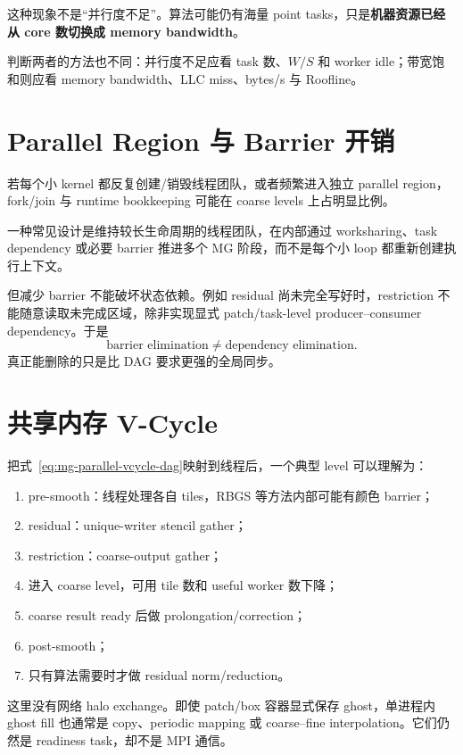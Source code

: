 这种现象不是“并行度不足”。算法可能仍有海量 point tasks，只是\textbf{机器资源已经从 core 数切换成 memory bandwidth}。

判断两者的方法也不同：并行度不足应看 task 数、$W/S$ 和 worker idle；带宽饱和则应看 memory bandwidth、LLC miss、bytes/s 与 Roofline。

\section{Parallel Region 与 Barrier 开销}

若每个小 kernel 都反复创建/销毁线程团队，或者频繁进入独立 parallel region，fork/join 与 runtime bookkeeping 可能在 coarse levels 上占明显比例。

一种常见设计是维持较长生命周期的线程团队，在内部通过 worksharing、task dependency 或必要 barrier 推进多个 MG 阶段，而不是每个小 loop 都重新创建执行上下文。

但减少 barrier 不能破坏状态依赖。例如 residual 尚未完全写好时，restriction 不能随意读取未完成区域，除非实现显式 patch/task-level producer--consumer dependency。于是
\begin{equation}
\boxed{
\text{barrier elimination}
\neq
\text{dependency elimination}.
}
\end{equation}
真正能删除的只是比 DAG 要求更强的全局同步。

\section{共享内存 V-Cycle}

把式~\eqref{eq:mg-parallel-vcycle-dag}映射到线程后，一个典型 level 可以理解为：

\begin{enumerate}
\item pre-smooth：线程处理各自 tiles，RBGS 等方法内部可能有颜色 barrier；
\item residual：unique-writer stencil gather；
\item restriction：coarse-output gather；
\item 进入 coarse level，可用 tile 数和 useful worker 数下降；
\item coarse result ready 后做 prolongation/correction；
\item post-smooth；
\item 只有算法需要时才做 residual norm/reduction。
\end{enumerate}

这里没有网络 halo exchange。即使 patch/box 容器显式保存 ghost，单进程内 ghost fill 也通常是 copy、periodic mapping 或 coarse--fine interpolation。它们仍然是 readiness task，却不是 MPI 通信。

